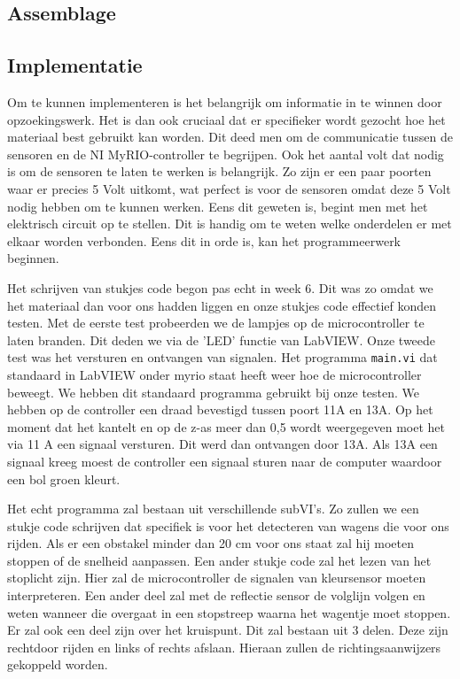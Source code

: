 \documentclass[a4paper,twoside,kulak]{kulakreport} %
\begin{document}
\subsection{Assemblage}

\subsection{Implementatie}


Om te kunnen implementeren is het belangrijk om informatie in te winnen door opzoekingswerk. Het is dan ook cruciaal dat er specifieker wordt gezocht hoe het materiaal best gebruikt kan worden. 
Dit deed men om de communicatie tussen de sensoren en de NI MyRIO-controller te begrijpen. Ook het aantal volt dat nodig is om de sensoren te laten te werken is belangrijk. Zo zijn er een paar poorten waar er precies 5 Volt uitkomt, wat perfect is voor de sensoren omdat deze 5 Volt nodig hebben om te kunnen werken. Eens dit geweten is, begint men met het elektrisch circuit op te stellen. Dit is handig om te weten welke onderdelen er met elkaar worden verbonden. Eens dit in orde is, kan het programmeerwerk beginnen.

Het schrijven van stukjes code begon pas echt in week 6. Dit was zo omdat we het materiaal dan voor ons hadden liggen en onze stukjes code effectief konden testen. Met de eerste test probeerden we de lampjes op de microcontroller te laten branden. Dit deden we via de 'LED' functie van LabVIEW. Onze tweede test was het versturen en ontvangen van signalen. Het programma \texttt{main.vi} dat standaard in LabVIEW onder myrio staat heeft weer hoe de microcontroller beweegt. We hebben dit standaard programma gebruikt bij onze testen. We hebben op de controller een draad bevestigd tussen poort 11A en 13A. Op het moment dat het kantelt en op de z-as meer dan 0,5 wordt weergegeven moet het via 11 A een signaal versturen. Dit werd dan ontvangen door 13A. Als 13A een signaal kreeg moest de controller een signaal sturen naar de computer waardoor een bol groen kleurt. 

Het echt programma zal bestaan uit verschillende subVI's. Zo zullen we een stukje code schrijven dat specifiek is voor het detecteren van wagens die voor ons rijden. Als er een obstakel minder dan 20 cm voor ons staat zal hij moeten stoppen of de snelheid aanpassen. Een ander stukje code zal het lezen van het stoplicht zijn. Hier zal de microcontroller de signalen van kleursensor moeten interpreteren. Een ander deel zal met de reflectie sensor de volglijn volgen en weten wanneer die overgaat in een stopstreep waarna het wagentje moet stoppen.
Er zal ook een deel zijn over het kruispunt. Dit zal bestaan uit 3 delen. Deze zijn rechtdoor rijden en links of rechts afslaan. Hieraan zullen de richtingsaanwijzers gekoppeld worden. 
\end{document}
